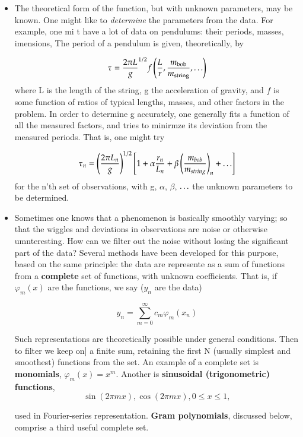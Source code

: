 \begin{itemize}
    \item The theoretical form of the function, but with unknown parameters, may be known. One might like to \textit{determine} the parameters from the data. For example, one mi t have a lot of data on pendulums: their periods, masses, imensions, \etc The period of a pendulum is given, theoretically, by
    
    \begin{equation}
    \tau = \frac{2\pi L}{g}^{1/2} f\left(\frac{L}{r},\frac{m_{\text{bob}}}{m_{\text{string}}},\mathellipsis\right)
    \end{equation}
    where L is the length of the string, g the acceleration of gravity, and $f$ is some function of ratios of typical lengths, masses, and other factors in the problem. In order to determine g accurately, one generally fits a function of all the measured factors, and tries to minirmze its deviation from the measured periods. That is, one might try
    
    \begin{equation}
    \tau_{n} = \left(\frac{2\pi L_{n}}{g}\right)^{1/2} \left[ 1 + \alpha \frac{r_{n}}{L_{n}} + \beta\left(\frac{m_{bob}}{m_{string}}\right)_{n} + \mathellipsis\right]
    \end{equation}
    for the n'th set of observations, with g, $\alpha$, $\beta$, $\mathellipsis$ the unknown parameters to be determined.
    
    \item Sometimes one knows that a phenomenon is basically smoothly varying; so that the wiggles and deviations in observations are noise or otherwise umnteresting. How can we filter out the noise without losing the significant part of the data? Several methods have been developed for this purpose, based on the same principle: the data are represente as a sum of functions from a \textbf{complete} set of functions, with unknown coefficients. That is, if $\varphi_{m}(x)$ are the functions, we say ($y_n$ are the data)

    \begin{equation}\label{eq:08_25}
    y_n = \sum_{m=0}^{\infty}c_{m}\varphi_{m}(x_{n})
    \end{equation}

    Such representations are theoretically possible under general conditions. Then to filter we keep on] a finite sum, retaining the first N (usually simplest and smoothest) functions from the set. An example of a complete set is \textbf{monomials}, $\varphi_{m}(x) = x^{m}$. Another is \textbf{sinusoidal (trigonometric) functions},
    \begin{equation*}
        \sin(2\pi mx), \cos(2\pi mx), 0 \leq x \leq 1,
    \end{equation*}
    
    used in Fourier-series representation. \textbf{Gram polynomials}, discussed below, comprise a third useful complete set.
\end{itemize}

